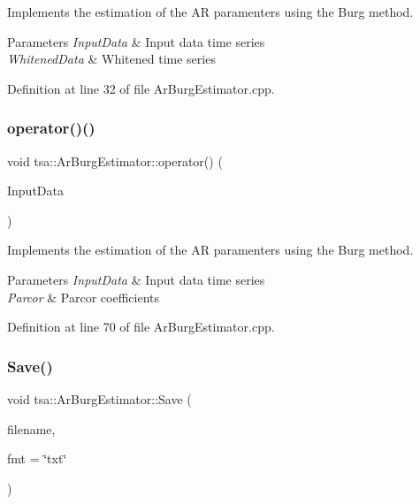 Implements the estimation of the AR paramenters using the Burg method.


\begin{DoxyParams}{Parameters}
{\em Input\+Data} & Input data time series \\
\hline
{\em Whitened\+Data} & Whitened time series \\
\hline
\end{DoxyParams}


Definition at line 32 of file Ar\+Burg\+Estimator.\+cpp.

\mbox{\label{classtsa_1_1_ar_burg_estimator_a84c6368cebbbe6965e28769e406d4310}} 
\subsubsection{\texorpdfstring{operator()()}{operator()()}\hspace{0.1cm}{\footnotesize\ttfamily [2/2]}}
{\footnotesize\ttfamily void tsa\+::\+Ar\+Burg\+Estimator\+::operator() (\begin{DoxyParamCaption}\item[{\hyperlink{namespacetsa_ac599574bcc094eda25613724b8f3ca9e}{Seq\+View\+Double} \&}]{Input\+Data }\end{DoxyParamCaption})}

Implements the estimation of the AR paramenters using the Burg method.


\begin{DoxyParams}{Parameters}
{\em Input\+Data} & Input data time series \\
\hline
{\em Parcor} & Parcor coefficients \\
\hline
\end{DoxyParams}


Definition at line 70 of file Ar\+Burg\+Estimator.\+cpp.

\mbox{\label{classtsa_1_1_ar_burg_estimator_a5f666a51727cfd49d748973b8f050763}} 
\subsubsection{\texorpdfstring{Save()}{Save()}}
{\footnotesize\ttfamily void tsa\+::\+Ar\+Burg\+Estimator\+::\+Save (\begin{DoxyParamCaption}\item[{const char $\ast$}]{filename,  }\item[{const char $\ast$}]{fmt = {\ttfamily \char`\"{}txt\char`\"{}} }\end{DoxyParamCaption})\hspace{0.3cm}{\ttfamily [inline]}}



